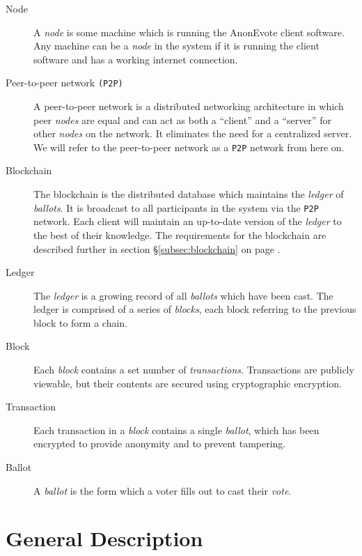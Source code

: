 \documentclass[a4paper,12pt]{article}
\newcommand{\proj}{AnonEvote}
\begin{document}
\begin{description}

    \item[Node]
        A \textit{node} is some machine which is running the \proj{} client software. Any machine can be a \textit{node} in the system if it is running the client software and has a working internet connection.

    \item[Peer-to-peer network \texttt{(P2P)}]
        A peer-to-peer network is a distributed networking architecture in which peer \textit{nodes} are equal and can act as both a ``client'' and a ``server'' for other \textit{nodes} on the network. It eliminates the need for a centralized server. We will refer to the peer-to-peer network as a \texttt{P2P} network from here on.

	\item[Blockchain]
		The blockchain is the distributed database which maintains the \textit{ledger} of \textit{ballots}. It is broadcast to all participants in the system via the \texttt{P2P} network. Each client will maintain an up-to-date version of the \textit{ledger} to the best of their knowledge. The requirements for the blockchain are described further in section \S\ref{subsec:blockchain} on page \pageref{subsec:blockchain}.

	\item[Ledger]
		The \textit{ledger} is a growing record of all \textit{ballots} which have been cast. The ledger is comprised of a series of \textit{blocks}, each block referring to the previous block to form a chain.

    \item[Block]
        Each \textit{block} contains a set number of \textit{transactions}. Transactions are publicly viewable, but their contents are secured using cryptographic encryption.

	\item[Transaction]
		Each transaction in a \textit{block} contains a single \textit{ballot}, which has been encrypted to provide anonymity and to prevent tampering.

    \item[Ballot]
        A \textit{ballot} is the form which a voter fills out to cast their \textit{vote}.

\end{description}

\section{General Description}
\end{document}
